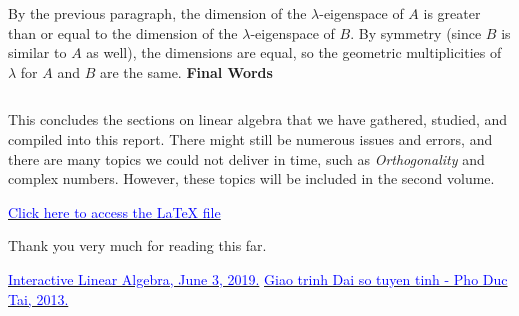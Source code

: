 \documentclass[a4paper,12pt]{article}
\begin{document}
By the previous paragraph, the dimension of the \( \lambda \)-eigenspace of \( A \) is greater than or equal to the dimension of the \( \lambda \)-eigenspace of \( B \). By symmetry (since \( B \) is similar to \( A \) as well), the dimensions are equal, so the geometric multiplicities of \( \lambda \) for \( A \) and \( B \) are the same.
\newpage
\Large \textbf{Final Words}

\[\]

\small This concludes the sections on linear algebra that we have gathered, studied, and compiled into this report. There might still be numerous issues and errors, and there are many topics we could not deliver in time, such as \textit{Orthogonality} and complex numbers. However, these topics will be included in the second volume. 


\href{https://www.overleaf.com/read/xqypkxkcjbqq#9eb7fe}{\textcolor{blue}{Click here to access the LaTeX file}}

Thank you very much for reading this far.


\vspace{0.5cm}
\vfill
\begin{thebibliography}{99}
 \href{https://textbooks.math.gatech.edu/ila/overview.html}{\textcolor{blue}{Interactive Linear Algebra, June 3, 2019.}}
  \href{https://drive.google.com/file/d/1kOGBP1jyFYaOrnHeAGeAL08kvhG1Rmb-/view?usp=sharing}{\textcolor{blue}{Giao trinh Dai so tuyen tinh - Pho Duc Tai, 2013.}}
\end{thebibliography}
\end{document}
